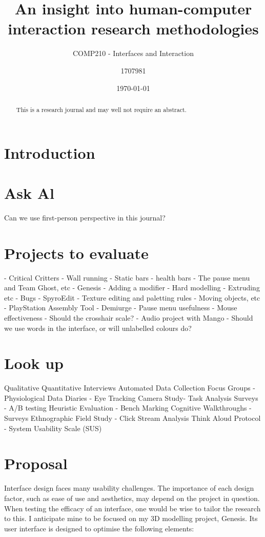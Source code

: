 \documentclass{scrartcl}
\title{An insight into human-computer interaction research methodologies}
\subtitle{COMP210 - Interfaces and Interaction}
\date{\today}
\author{1707981}
\begin{document}
\maketitle
{}

\begin{abstract}
This is a research journal and may well not require an abstract.
\end{abstract}

\section{Introduction}

\section{Ask Al}
Can we use first-person perspective in this journal?

\section{Projects to evaluate}
- Critical Critters
	- Wall running
	- Static bars
	- health bars
	- The pause menu and Team Ghost, etc
- Genesis
	- Adding a modifier
	- Hard modelling
	- Extruding etc
	- Bugs
- SpyroEdit
	- Texture editing and paletting rules
	- Moving objects, etc
- PlayStation Assembly Tool
- Demiurge
	- Pause menu usefulness
	- Mouse effectiveness
	- Should the crosshair scale?
- Audio project with Mango
    - Should we use words in the interface, or will unlabelled colours do?

\section{Look up}
Qualitative Quantitative
Interviews     Automated Data Collection
Focus Groups - Physiological Data
Diaries - Eye Tracking
Camera Study-  Task Analysis
Surveys - A/B testing
Heuristic Evaluation - Bench Marking
Cognitive Walkthroughs - Surveys
Ethnographic Field Study - Click Stream Analysis
Think Aloud Protocol - System Usability Scale (SUS)


\section{Proposal}
Interface design faces many usability challenges. The importance of each design factor, such as ease of use and aesthetics, may depend on the project in question. When testing the efficacy of an interface, one would be wise to tailor the research to this. I anticipate mine to be focused on my 3D modelling project, Genesis. Its user interface is designed to optimise the following elements:
\end{document}
